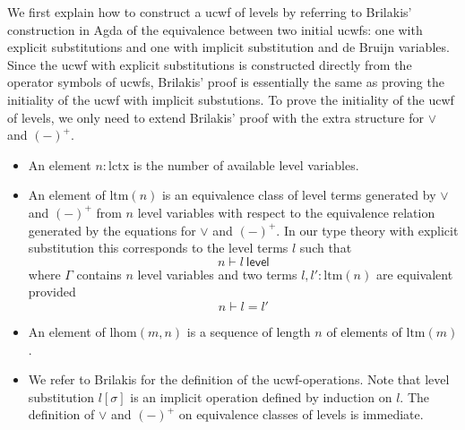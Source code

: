 \documentclass[11pt,a4paper]{article}
\theoremstyle{plain}
\theoremstyle{definition}
\newcommand{\level}{\mathsf{level}}
\def\lhom{\mathrm{lhom}}
\def\lctx{\mathrm{lctx}}
\def\ltm{\mathrm{ltm}}
\def\lp{\mathrm{lp}}
\def\lq{\mathrm{lq}}
\def\s{\mathrm{s}}
\begin{document}
We first explain how to construct a ucwf of levels by referring to Brilakis'  \cite{Brilakis18} construction in Agda of the equivalence between two initial ucwfs: one with explicit substitutions and one with implicit substitution and de Bruijn variables. Since the ucwf with explicit substitutions is constructed directly from the operator symbols of ucwfs, Brilakis' proof is essentially the same as proving the initiality of the ucwf with implicit substutions. To prove the initiality of the ucwf of levels, we only need to extend Brilakis' proof with the extra structure for $\vee$ and $(-)^+$.
\begin{itemize}
\item An element $n : \lctx$ is the number of available level variables.
\item An element of $\ltm(n)$ is an equivalence class of level terms generated by $\vee$ and $(-)^+$ from $n$ level variables with respect to the equivalence relation generated by the equations for $\vee$ and $(-)^+$. In our type theory with explicit substitution \cite{BezemCDE22} this corresponds to the level terms $l$ such that 
$$
n \vdash l\ \level
$$
where $\Gamma$ contains $n$ level variables and two terms $l, l' : \ltm(n)$ are equivalent provided
$$
n \vdash l = l'
$$
\item An element of $\lhom(m,n)$ is a sequence of length $n$ of elements of $\ltm(m)$.
\item We refer to Brilakis for the definition of the ucwf-operations. Note that level substitution $l[\sigma]$ is an implicit operation defined by induction on $l$. The definition of $\vee$ and $(-)^+$ on equivalence classes of levels is immediate.
\end{itemize}
\end{document}
